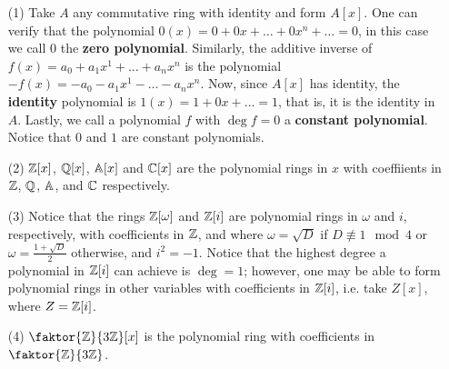 \begin{example}\label{1.6}
    \begin{enumerate}
        \item[(1)] Take $A$ any commutative ring with identity and form $A[x]$.
            One can verify that the polynomial $0(x)=0+0x+\dots+0x^n+\dots=0$,
            in this case we call $0$ the \textbf{zero polynomial}. Similarly,
            the additive inverse of $f(x)=a_0+a_1x^1+\dots+a_nx^n$ is the
            polynomial $-f(x)=-a_0-a_1x^1-\dots-a_nx^n$. Now, since $A[x]$ has
            identity, the \textbf{identity} polynomial is $1(x)=1+0x+\dots=1$,
            that is, it is the identity in $A$. Lastly, we call a polynomial $f$
            with  $\deg{f}=0$ a \textbf{constant polynomial}. Notice that $0$
            and  $1$ are constant polynomials.

        \item[(2)] $\mathbb{Z}[x]$, $\mathbb{Q}[x]$, $\mathbb{A}[x]$ and $\mathbb{C}[x]$ are the polynomial
            rings in $x$ with coeffiients in $\mathbb{Z}$, $\mathbb{Q}$, $\mathbb{A}$, and $\mathbb{C}$
            respectively.

        \item[(3)] Notice that the rings $\mathbb{Z}[\omega]$ and $\mathbb{Z}[i]$ are polynomial
            rings in $\omega$ and  $i$, respectively, with coefficients in $\mathbb{Z}$,
            and where $\omega=\sqrt{D}$ if $D \not\equiv 1 \mod{4}$ or
            $\omega=\frac{1+\sqrt{D}}{2}$ otherwise, and $i^2=-1$. Notice that
            the highest degree a polynomial in  $\mathbb{Z}[i]$ can achieve is $\deg=1$;
            however, one may be able to form polynomial rings in other variables
            with coefficients in $\mathbb{Z}[i]$, i.e. take $Z[x]$, where $Z=\mathbb{Z}[i]$.

        \item[(4)] $\faktor{\Z}{3\Z}[x]$ is the polynomial ring with
            coefficients in $\faktor{\Z}{3\Z}$.
    \end{enumerate}
\end{example}

